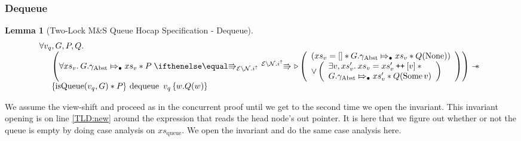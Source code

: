 \documentclass[a4paper, 10pt]{report}
\theoremstyle{definition}
\newtheorem{lemma}[theorem]{Lemma}
\newcommand{\dequeue}{\operatorname{dequeue}}
\newcommand{\msq}{M\&S Queue}
\newcommand{\tlmsq}{Two-Lock \msq{}}
\newcommand{\isqueue}{\operatorname{isQueue}}
\newcommand{\vq}{v_q}
\newcommand{\xsqueue}{xs_{\mathrm{queue}}}
\newcommand{\nodeval}{\valB}
\newcommand{\absvalue}{\val}
\newcommand{\absvalueList}{xs_v}
\newcommand{\Qg}{G}
\newcommand{\gabst}{\gname_{\mathrm{Abst}}}
\newcommand\catenate{\mathbin{\text{\ttfamily\upshape ++}}}
\newcommand{\Nl}{\ensuremath{\mathcal{N}}}
\newcommand{\abstractstateauth}[2]{#1 \Mapsto_{\bullet} #2}
\newcommand{\hocapspecdeqVSGen}[6]{
  \abstractstateauth{#1.\gabst}{#4} \star{} #2 \vs[\mask\setminus\Nl.i^\uparrow] \later
  \left(
    \begin{array}{l}
      (#4 = [] \star{} \abstractstateauth{#1.\gabst}{#4} \star{} #3(\None))\\
      \lor{}
      \left(
        \begin{array}{l}
          \Exists #5, #6 . #4 = #6 \catenate [#5] \star{}\\
          \abstractstateauth{#1.\gabst}{#6} \star{} #3(\Some{#5})
        \end{array}
        \right)
    \end{array}
  \right)
}
\newcommand{\hocapspecdeqVS}[4]{\hocapspecdeqVSGen{#1}{#2}{#3}{#4}{\absvalue}{#4'}}
\newcommand{\hocapspecdeqHT}[4]{\hoare{\isqueue(#1, #2) \star{} #3}{\dequeue \ #1}{\nodeval . #4(\nodeval)}}
\newcommand{\hocapspecdeqGen}[5]{\begin{array}[t]{l}
  \All #1, #2, #3, #4.\\
  \begin{array}[t]{l}
  \quad\left(\All #5 . \hocapspecdeqVS{#2}{#3}{#4}{#5} \right) \wand\\
  \quad\hocapspecdeqHT{#1}{#2}{#3}{#4}
  \end{array}
\end{array}}
\newcommand{\hocapspecdeq}{\hocapspecdeqGen{\vq}{\Qg}{P}{Q}{\absvalueList}}
\begin{document}
\subsubsection{Dequeue}
\begin{lemma}[\tlmsq{} Hocap Specification - Dequeue]\label{TLMSQ:spec:hocap:dequeue}
  \begin{equation*}
    \hocapspecdeq
  \end{equation*}
\end{lemma}
We assume the view-shift and proceed as in the concurrent proof until we get to the second time we open the invariant. This invariant opening is on line \ref{TLD:new} around the expression that reads the head node's out pointer. It is here that we figure out whether or not the queue is empty by doing case analysis on $\xsqueue$. We open the invariant and do the same case analysis here.
\end{document}
